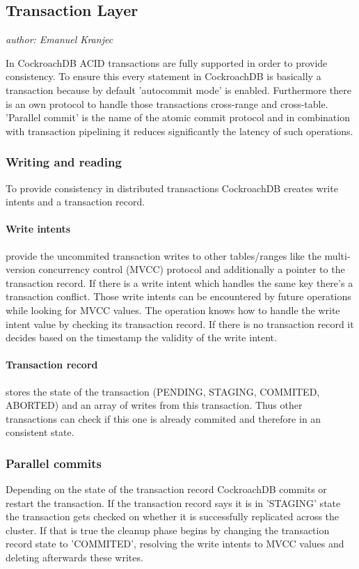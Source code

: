 \subsection{Transaction Layer}
\emph{author: Emanuel Kranjec}\bigskip

In CockroachDB ACID transactions are fully supported in order to provide consistency. To ensure this every statement in 
CockroachDB is basically a transaction because by default 'autocommit mode' is enabled. Furthermore there is an own protocol
to handle those transactions cross-range and cross-table. 'Parallel commit' is the name of the atomic commit protocol and in
combination with transaction pipelining it reduces significantly the latency of such operations.

\subsubsection{Writing and reading}
To provide consistency in distributed transactions CockroachDB creates write intents and a transaction record.

\paragraph{Write intents} provide the uncommited transaction writes to other tables/ranges like the multi-version concurrency 
control (MVCC) protocol and additionally a pointer to the transaction record. If there is a write intent which handles the
same key there's a transaction conflict. Those write intents can be encountered by future operations while looking for 
MVCC values. The operation knows how to handle the write intent value by checking its transaction record. If there is no 
transaction record it decides based on the timestamp the validity of the write intent. 

\paragraph{Transaction record} stores the state of the transaction (PENDING, STAGING, COMMITED, ABORTED) and an array of
writes from this transaction. Thus other transactions can check if this one is already commited and therefore in an
consistent state.

\subsubsection{Parallel commits}
Depending on the state of the transaction record CockroachDB commits or restart the transaction. If the transaction record
says it is in 'STAGING' state the transaction gets checked on whether it is successfully replicated across the cluster. 
If that is true the cleanup phase begins by changing the transaction record state to 'COMMITED', resolving the write intents 
to MVCC values and deleting afterwards these writes.

